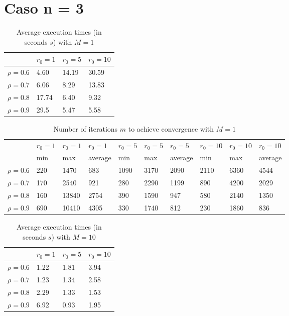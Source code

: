 \documentclass[a4paper,11pt,openright]{report}
\begin{document}
\section*{Caso n = 3} 
\begin{table}[H]
\centering
\addtolength{\leftskip}{-1.5cm}
\addtolength{\rightskip}{-1.5cm}
\begin{tabular}{|c|lll|}
\hline
$ $ & $r_0 = 1$ & $r_0 = 5$ & $r_0 = 10$ \\
\hline
$\rho = 0.6$ & 4.60 & 14.19 & 30.59 \\

$\rho = 0.7$ & 6.06 & 8.29 & 13.83 \\

$\rho = 0.8$ & 17.74 & 6.40 & 9.32 \\

$\rho = 0.9$ & 29.5 & 5.47 & 5.58 \\
\hline
\end{tabular}
\caption{Average execution
 times (in seconds $s$) with $M = 1$}
\end{table}
\begin{table}[H]
\centering
\addtolength{\leftskip}{-1.5cm}
\addtolength{\rightskip}{-1.5cm}
\begin{tabular}{|c|lllllllll|}
\hline
$ $ & $r_0 = 1$ & $r_0 = 1$ & $r_0 = 1$ & $r_0 = 5$ & $r_0 = 5$ & $r_0 = 5$ & $r_0 = 10$ & $r_0 = 10$ & $r_0 = 10$  \\
$ $ & min & max & average & min & max & average & min & max & average \\ 
\hline
$\rho = 0.6$ & 220 & 1470 & 683 & 1090 & 3170 & 2090 & 2110 & 6360 & 4544 \\

$\rho = 0.7$ & 170 & 2540 & 921 & 280 & 2290 & 1199 & 890 & 4200 & 2029\\

$\rho = 0.8$ & 160 & 13840 & 2754 & 390 & 1590 & 947 & 580 & 2140 & 1350\\

$\rho = 0.9$ & 690 & 10410 & 4305 & 330 & 1740 & 812 & 230 & 1860 & 836\\
\hline
\end{tabular}
\caption{Number of iterations $m$ to achieve convergence with $M = 1$}
\end{table}
\begin{table}[H]
\centering
\addtolength{\leftskip}{-1.5cm}
\addtolength{\rightskip}{-1.5cm}
\begin{tabular}{|c|lll|}
\hline
$ $ & $r_0 = 1$ & $r_0 = 5$ & $r_0 = 10$ \\
\hline
$\rho = 0.6$ & 1.22 & 1.81 & 3.94 \\

$\rho = 0.7$ & 1.23 & 1.34 & 2.58 \\

$\rho = 0.8$ & 2.29 & 1.33 & 1.53 \\

$\rho = 0.9$ & 6.92 & 0.93 & 1.95 \\
\hline
\end{tabular}
\caption{Average execution
 times (in seconds $s$) with $M = 10$}
\end{table}
\end{document}
